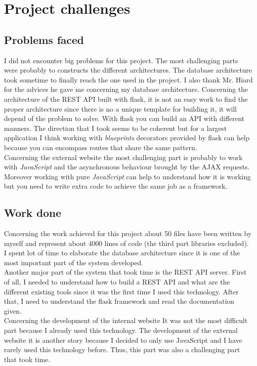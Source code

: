 \section{Project challenges}
\subsection{Problems faced}
I did not encounter big problems for this project. The most challenging parts were probably to constructs the different architectures. The database architecture took sometime to finally reach the one used in the project. I also thank Mr. Hiard for the advices he gave me concerning my database architecture. Concerning the architecture of the REST API built with flask, it is not an easy work to find the proper architecture since there is no a unique template for building it, it will depend of the problem to solve. With flask you can build an API with different manners. The direction that I took seems to be coherent but for a largest application I think working with \textit{blueprints} decorators provided by flask can help because you can encompass routes that share the same pattern.\\

Concerning the external website the most challenging part is probably to work with \textit{JavaScript} and the asynchronous behaviour brought by the AJAX requests. Moreover working with pure \textit{JavaScript} can help to understand how it is working but you need to write extra code to achieve the same job as a framework.

\subsection{Work done}
Concerning the work achieved for this project about 50 files have been written by myself and represent about 4000 lines of code (the third part libraries excluded). I spent lot of time to elaborate the database architecture since it is one of the most important part of the system developed.\\

Another major part of the system that took time is the REST API server. First of all, I needed to understand how to build a REST API and what are the different existing tools since it was the first time I used this technology. After that, I need to understand the flask framework and read the documentation given.\\

Concerning the development of the internal website It was not the most difficult part because I already used this technology. The development of the external website it is another story because I decided to only use JavaScript and I have rarely used this technology before. Thus, this part was also a challenging part that took time.\\

